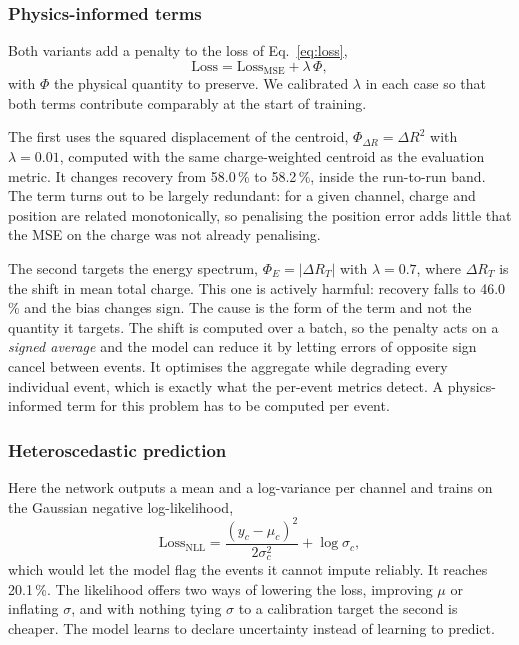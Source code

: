 \documentclass[10pt,conference]{IEEEtran}
\begin{document}
\subsubsection{Physics-informed terms}
Both variants add a penalty to the loss of Eq.~\ref{eq:loss},
%
\begin{equation}
\mathrm{Loss} = \mathrm{Loss}_{\mathrm{MSE}} + \lambda \, \Phi,
\label{eq:physloss}
\end{equation}
%
with $\Phi$ the physical quantity to preserve. We calibrated $\lambda$ in each
case so that both terms contribute comparably at the start of training.

The first uses the squared displacement of the centroid,
$\Phi_{\Delta R} = \Delta R^{2}$ with $\lambda = 0.01$, computed with the same
charge-weighted centroid as the evaluation metric. It changes recovery from
58.0\,\% to 58.2\,\%, inside the run-to-run band. The term turns out to be
largely redundant: for a given channel, charge and position are related
monotonically, so penalising the position error adds little that the MSE on the
charge was not already penalising.

The second targets the energy spectrum, $\Phi_{E} = \lvert \Delta R_{T} \rvert$
with $\lambda = 0.7$, where $\Delta R_{T}$ is the shift in mean total charge.
This one is actively harmful: recovery falls to 46.0\,\% and the bias changes
sign. The cause is the form of the term and not the quantity it targets. The
shift is computed over a batch, so the penalty acts on a \emph{signed average}
and the model can reduce it by letting errors of opposite sign cancel between
events. It optimises the aggregate while degrading every individual event, which
is exactly what the per-event metrics detect. A physics-informed term for this
problem has to be computed per event.

\subsubsection{Heteroscedastic prediction}
Here the network outputs a mean and a log-variance per channel and trains on the
Gaussian negative log-likelihood,
%
\begin{equation}
\mathrm{Loss}_{\mathrm{NLL}} = \frac{(y_{c} - \mu_{c})^{2}}{2\sigma_{c}^{2}}
                             + \log \sigma_{c},
\label{eq:nll}
\end{equation}
%
which would let the model flag the events it cannot impute reliably. It reaches
20.1\,\%. The likelihood offers two ways of lowering the loss, improving $\mu$
or inflating $\sigma$, and with nothing tying $\sigma$ to a calibration target
the second is cheaper. The model learns to declare uncertainty instead of
learning to predict.
\end{document}
